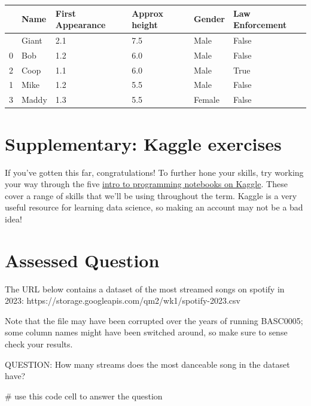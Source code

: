 \documentclass[
  letterpaper,
  DIV=11,
  numbers=noendperiod]{scrreprt}
\newenvironment{Shaded}{\begin{snugshade}}{\end{snugshade}}
\newcommand{\CommentTok}[1]{\textcolor[rgb]{0.37,0.37,0.37}{#1}}
\begin{document}
\begin{longtable}[]{@{}llllll@{}}
\toprule\noalign{}
& Name & First Appearance & Approx height & Gender & Law Enforcement \\
\midrule\noalign{}
\endhead
\bottomrule\noalign{}
\endlastfoot
4 & Giant & 2.1 & 7.5 & Male & False \\
0 & Bob & 1.2 & 6.0 & Male & False \\
2 & Coop & 1.1 & 6.0 & Male & True \\
1 & Mike & 1.2 & 5.5 & Male & False \\
3 & Maddy & 1.3 & 5.5 & Female & False \\
\end{longtable}


\hypertarget{supplementary-kaggle-exercises}{%
\chapter{Supplementary: Kaggle
exercises}\label{supplementary-kaggle-exercises}}

If you've gotten this far, congratulations! To further hone your skills,
try working your way through the five
\href{https://www.kaggle.com/learn/intro-to-programming}{intro to
programming notebooks on Kaggle}. These cover a range of skills that
we'll be using throughout the term. Kaggle is a very useful resource for
learning data science, so making an account may not be a bad idea!


\hypertarget{assessed-question}{%
\chapter{Assessed Question}\label{assessed-question}}

The URL below contains a dataset of the most streamed songs on spotify
in 2023: https://storage.googleapis.com/qm2/wk1/spotify-2023.csv

Note that the file may have been corrupted over the years of running
BASC0005; some column names might have been switched around, so make
sure to sense check your results.

QUESTION: How many streams does the most danceable song in the dataset
have?

\begin{Shaded}
\begin{Highlighting}[]
\CommentTok{\# use this code cell to answer the question}
\end{Highlighting}
\end{Shaded}
\end{document}
